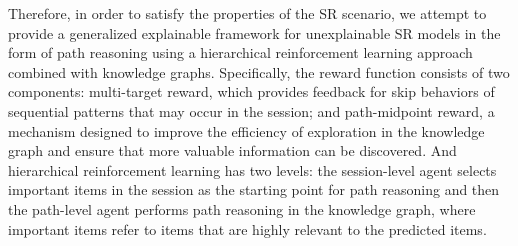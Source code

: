 \documentclass[10pt,journal,compsoc]{IEEEtran}
\begin{document}
Therefore, in order to satisfy the properties of the SR scenario, we attempt to provide a generalized explainable framework for unexplainable SR models in the form of path reasoning using a hierarchical reinforcement learning approach combined with knowledge graphs. Specifically, the reward function consists of two components: multi-target reward, which provides feedback for skip behaviors of sequential patterns that may occur in the session; and path-midpoint reward, a mechanism designed to improve the efficiency of exploration in the knowledge graph and ensure that more valuable information can be discovered. And hierarchical reinforcement learning has two levels: the session-level agent selects important items in the session as the starting point for path reasoning and then the path-level agent performs path reasoning in the knowledge graph, where important items refer to items that are highly relevant to the predicted items.
\end{document}
